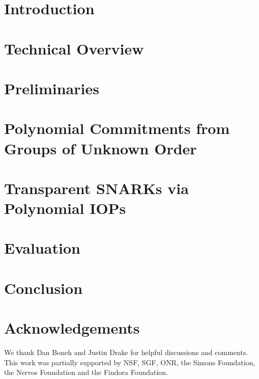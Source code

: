 \documentclass[12pt]{article}
\theoremstyle{definition}
\begin{document}
\section{Introduction}
 
\section{Technical Overview}\label{sec:overview} 

\section{Preliminaries}


\section{Polynomial Commitments from Groups of Unknown Order}
\label{sec:protocol}


\section{Transparent SNARKs via Polynomial IOPs}\label{sec:polyiop}


\section{Evaluation}


\section{Conclusion}

\section*{Acknowledgements}
We thank Dan Boneh and Justin Drake for helpful discussions and comments.
This work was partially supported by NSF, SGF, ONR, the Simons Foundation, the Nervos Foundation and the Findora Foundation. 

{\footnotesize
  }

\appendix

 
\end{document}
